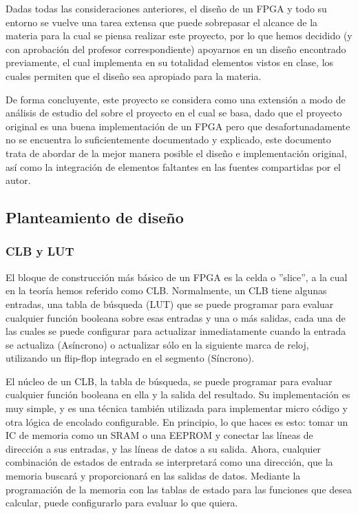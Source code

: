 \documentclass[12pt]{article}
\begin{document}
Dadas todas las consideraciones anteriores, el diseño de un FPGA y todo su entorno se vuelve una tarea extensa que puede sobrepasar el alcance de la materia para la cual se piensa realizar este proyecto, por lo que hemos decidido (y con aprobación del profesor correspondiente) apoyarnos en un diseño encontrado previamente, el cual implementa en su totalidad elementos vistos en clase, los cuales permiten que el diseño sea apropiado para la materia.  

De forma concluyente, este proyecto se considera como una extensión a modo de análisis de estudio del sobre el proyecto en el cual se basa, dado que el proyecto original es una buena implementación de un FPGA pero que desafortunadamente no se encuentra lo suficientemente documentado y explicado, este documento trata de abordar de la mejor manera posible el diseño e implementación original, así como la integración de elementos faltantes en las fuentes compartidas por el autor.

\subsection{Planteamiento de diseño}

\subsubsection{CLB y LUT}

El bloque de construcción más básico de un FPGA es la celda o ''slice'', a la cual en la teoría hemos referido como CLB. Normalmente, un CLB tiene algunas entradas, una tabla de búsqueda (LUT) que se puede programar para evaluar cualquier función booleana sobre esas entradas y una o más salidas, cada una de las cuales se puede configurar para actualizar inmediatamente cuando la entrada se actualiza (Asíncrono) o actualizar sólo en la siguiente marca de reloj, utilizando un flip-flop integrado en el segmento (Síncrono). 
 
El núcleo de un CLB, la tabla de búsqueda, se puede programar para evaluar cualquier función booleana en ella y la salida del resultado. Su implementación es muy simple, y es una técnica también utilizada para implementar micro código y otra lógica de encolado configurable. En principio, lo que haces es esto: tomar un IC de memoria como un SRAM o una EEPROM y conectar las líneas de dirección a sus entradas, y las líneas de datos a su salida. Ahora, cualquier combinación de estados de entrada se interpretará como una dirección, que la memoria buscará y proporcionará en las salidas de datos. Mediante la programación de la memoria con las tablas de estado para las funciones que desea calcular, puede configurarlo para evaluar lo que quiera. 
 
\end{document}
